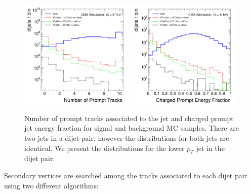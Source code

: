 \begin{figure}
\centering
\includegraphics[width=0.49\textwidth]{plots/discrimination/disc_NPromptTracks.pdf}
\includegraphics[width=0.49\textwidth]{plots/discrimination/disc_PromptEnergyFrac.pdf}
\caption{Number of prompt tracks associated to the jet and charged prompt jet energy fraction for signal and
background MC samples. There are two jets in a dijet pair, however the distributions for both jets are identical.
We present the distributions for the lower $p_T$ jet in the dijet pair.
\label{fig:discprompt}}

\end{figure}

Secondary vertices are searched among the tracks associated to each dijet pair 
using two different algorithms: 

